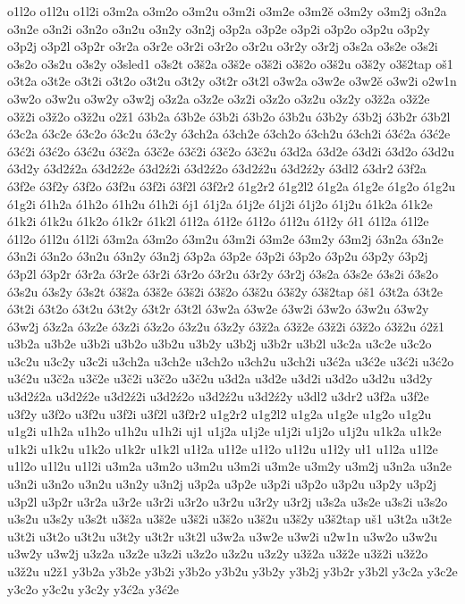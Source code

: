 {o1l2o
o1l2u
o1l2i
o3m2a
o3m2o
o3m2u
o3m2i
o3m2e
o3m2ě
o3m2y
o3m2j
o3n2a
o3n2e
o3n2i
o3n2o
o3n2u
o3n2y
o3n2j
o3p2a
o3p2e
o3p2i
o3p2o
o3p2u
o3p2y
o3p2j
o3p2l
o3p2r
o3r2a
o3r2e
o3r2i
o3r2o
o3r2u
o3r2y
o3r2j
o3s2a
o3s2e
o3s2i
o3s2o
o3s2u
o3s2y
o3sled1
o3s2t
o3š2a
o3š2e
o3š2i
o3š2o
o3š2u
o3š2y
o3š2tap
oš1
o3t2a
o3t2e
o3t2i
o3t2o
o3t2u
o3t2y
o3t2r
o3t2l
o3w2a
o3w2e
o3w2ě
o3w2i
o2w1n
o3w2o
o3w2u
o3w2y
o3w2j
o3z2a
o3z2e
o3z2i
o3z2o
o3z2u
o3z2y
o3ž2a
o3ž2e
o3ž2i
o3ž2o
o3ž2u
o2ž1                       
ó3b2a 
ó3b2e 
ó3b2i 
ó3b2o
ó3b2u
ó3b2y
ó3b2j
ó3b2r
ó3b2l
ó3c2a
ó3c2e
ó3c2o
ó3c2u
ó3c2y
ó3ch2a
ó3ch2e
ó3ch2o
ó3ch2u
ó3ch2i
ó3ć2a
ó3ć2e
ó3ć2i
ó3ć2o
ó3ć2u
ó3č2a
ó3č2e
ó3č2i
ó3č2o
ó3č2u
ó3d2a
ó3d2e
ó3d2i
ó3d2o
ó3d2u
ó3d2y
ó3d2ź2a
ó3d2ź2e
ó3d2ź2i
ó3d2ź2o
ó3d2ź2u
ó3d2ź2y
ó3dl2
ó3dr2
ó3f2a
ó3f2e
ó3f2y
ó3f2o
ó3f2u
ó3f2i
ó3f2l
ó3f2r2
ó1g2r2
ó1g2l2
ó1g2a
ó1g2e
ó1g2o
ó1g2u
ó1g2i
ó1h2a
ó1h2o
ó1h2u
ó1h2i
ój1
ó1j2a
ó1j2e
ó1j2i
ó1j2o
ó1j2u
ó1k2a
ó1k2e
ó1k2i
ó1k2u
ó1k2o
ó1k2r
ó1k2l
ó1ł2a
ó1ł2e
ó1ł2o
ó1ł2u
ó1ł2y
ół1
ó1l2a
ó1l2e
ó1l2o
ó1l2u
ó1l2i
ó3m2a
ó3m2o
ó3m2u
ó3m2i
ó3m2e
ó3m2y
ó3m2j
ó3n2a
ó3n2e
ó3n2i
ó3n2o
ó3n2u
ó3n2y
ó3n2j
ó3p2a
ó3p2e
ó3p2i
ó3p2o
ó3p2u
ó3p2y
ó3p2j
ó3p2l
ó3p2r
ó3r2a
ó3r2e
ó3r2i
ó3r2o
ó3r2u
ó3r2y
ó3r2j
ó3s2a
ó3s2e
ó3s2i
ó3s2o
ó3s2u
ó3s2y
ó3s2t
ó3š2a
ó3š2e
ó3š2i
ó3š2o
ó3š2u
ó3š2y
ó3š2tap
óš1
ó3t2a
ó3t2e
ó3t2i
ó3t2o
ó3t2u
ó3t2y
ó3t2r
ó3t2l
ó3w2a
ó3w2e
ó3w2i
ó3w2o
ó3w2u
ó3w2y
ó3w2j
ó3z2a
ó3z2e
ó3z2i
ó3z2o
ó3z2u
ó3z2y
ó3ž2a
ó3ž2e
ó3ž2i
ó3ž2o
ó3ž2u
ó2ž1                       
u3b2a 
u3b2e 
u3b2i 
u3b2o
u3b2u
u3b2y
u3b2j
u3b2r
u3b2l
u3c2a
u3c2e
u3c2o
u3c2u
u3c2y
u3c2i
u3ch2a
u3ch2e
u3ch2o
u3ch2u
u3ch2i
u3ć2a
u3ć2e
u3ć2i
u3ć2o
u3ć2u
u3č2a
u3č2e
u3č2i
u3č2o
u3č2u
u3d2a
u3d2e
u3d2i
u3d2o
u3d2u
u3d2y
u3d2ź2a
u3d2ź2e
u3d2ź2i
u3d2ź2o
u3d2ź2u
u3d2ź2y
u3dl2
u3dr2
u3f2a
u3f2e
u3f2y
u3f2o
u3f2u
u3f2i
u3f2l
u3f2r2
u1g2r2
u1g2l2
u1g2a
u1g2e
u1g2o
u1g2u
u1g2i
u1h2a
u1h2o
u1h2u
u1h2i
uj1
u1j2a
u1j2e
u1j2i
u1j2o
u1j2u
u1k2a
u1k2e
u1k2i
u1k2u
u1k2o
u1k2r
u1k2l
u1ł2a
u1ł2e
u1ł2o
u1ł2u
u1ł2y
uł1
u1l2a
u1l2e
u1l2o
u1l2u
u1l2i
u3m2a
u3m2o
u3m2u
u3m2i
u3m2e
u3m2y
u3m2j
u3n2a
u3n2e
u3n2i
u3n2o
u3n2u
u3n2y
u3n2j
u3p2a
u3p2e
u3p2i
u3p2o
u3p2u
u3p2y
u3p2j
u3p2l
u3p2r
u3r2a
u3r2e
u3r2i
u3r2o
u3r2u
u3r2y
u3r2j
u3s2a
u3s2e
u3s2i
u3s2o
u3s2u
u3s2y
u3s2t
u3š2a
u3š2e
u3š2i
u3š2o
u3š2u
u3š2y
u3š2tap
uš1
u3t2a
u3t2e
u3t2i
u3t2o
u3t2u
u3t2y
u3t2r
u3t2l
u3w2a
u3w2e
u3w2i
u2w1n
u3w2o
u3w2u
u3w2y
u3w2j
u3z2a
u3z2e
u3z2i
u3z2o
u3z2u
u3z2y
u3ž2a
u3ž2e
u3ž2i
u3ž2o
u3ž2u
u2ž1                       
y3b2a 
y3b2e 
y3b2i 
y3b2o
y3b2u
y3b2y
y3b2j
y3b2r
y3b2l
y3c2a
y3c2e
y3c2o
y3c2u
y3c2y
y3ć2a
y3ć2e
}
